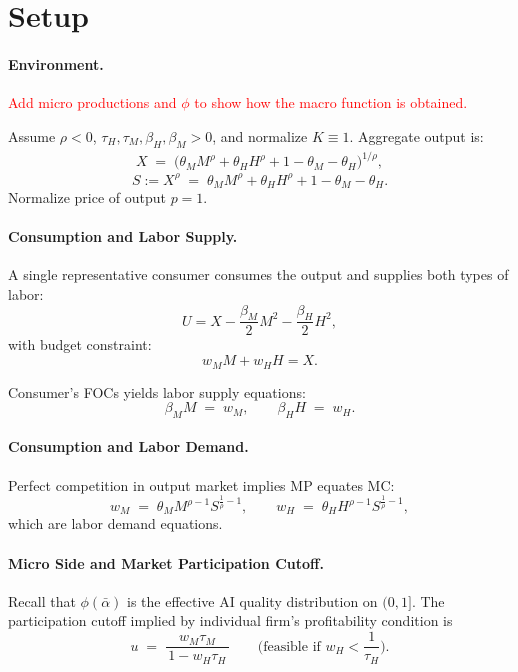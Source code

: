 \documentclass[english]{article}
\begin{document}
\bigskip

\section*{Setup}

\paragraph{Environment.}
\textcolor{red}{Add micro productions and $\phi$ to show how the macro function is obtained.}

Assume $\rho<0$, $\tau_H,\tau_M,\beta_H,\beta_M>0$, and normalize $K\equiv1$.
Aggregate output is:
\begin{align}
X \;=\; \Big(\theta_M M^\rho+\theta_H H^\rho+1-\theta_M-\theta_H\Big)^{1/\rho}, 
\end{align}
\[
S:=X^\rho \;=\; \theta_M M^\rho+\theta_H H^\rho+1-\theta_M-\theta_H.
\]
Normalize price of output $p=1$.


\paragraph{Consumption and Labor Supply.}
A single representative consumer consumes the output and supplies both types of labor:
\[
U = X - \frac{\beta_M}{2}M^2 - \frac{\beta_H}{2}H^2,
\]
with budget constraint:
\[
w_M M + w_H H = X.
\]

Consumer's FOCs yields labor supply equations:
\begin{equation}
\beta_M M \;=\; w_M,
\qquad
\beta_H H \;=\; w_H. \label{eq:labor_supply}
\end{equation}


\paragraph{Consumption and Labor Demand.}
Perfect competition in output market implies MP equates MC:
\begin{equation}
w_M \;=\; \theta_M M^{\rho-1} S^{\frac{1}{\rho}-1},
\qquad
w_H \;=\; \theta_H H^{\rho-1} S^{\frac{1}{\rho}-1}, \label{eq:labor_demand}
\end{equation}
which are labor demand equations.

\paragraph{Micro Side and Market Participation Cutoff.}
Recall that $\phi(\bar{\alpha})$ is the effective AI quality distribution on $(0,1]$.
The participation cutoff implied by individual firm's profitability condition is
\begin{equation}
u \;=\; \frac{w_M\tau_M}{\,1-w_H\tau_H\,}
\qquad\text{(feasible if \ }w_H < \frac{1}{\tau_H}\text{)}. \label{eq:u_def}
\end{equation}
\end{document}
